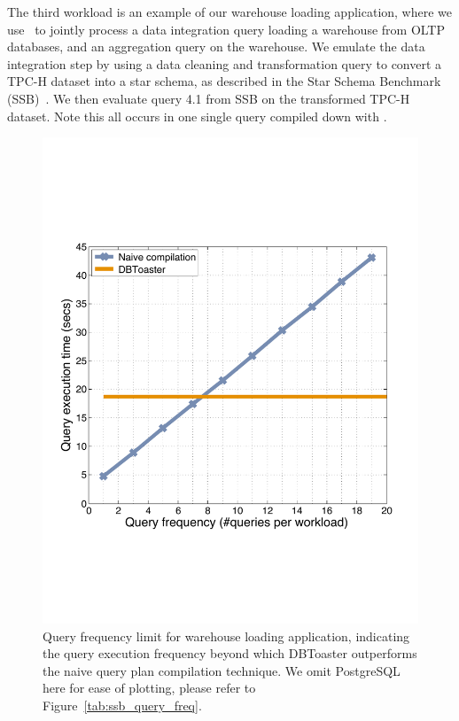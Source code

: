 The third workload is an example of our warehouse loading application, where we
use \compiler\ to jointly process a data integration query loading a warehouse
from OLTP databases, and an aggregation query on the warehouse. We emulate the
data integration step by using a data cleaning and transformation query to
convert a TPC-H dataset into a star schema, as described in the Star Schema
Benchmark (SSB)~\cite{poneil-ssb:07}. We then evaluate query 4.1 from SSB on the
transformed TPC-H dataset. Note this all occurs in one single query compiled down
with \compiler.


\begin{figure}[tb]
\begin{center}
\includegraphics[scale=0.4]{../plots/ssb_query_freq_dn.pdf}
\end{center}
\vspace{-4mm}
\caption{Query frequency limit for warehouse loading application, indicating the
query execution frequency beyond which DBToaster outperforms the naive query
plan compilation technique. We omit PostgreSQL here for ease of
plotting, please refer to Figure~\ref{tab:ssb_query_freq}.}
\label{fig:ssb_query_freq}
\end{figure}



